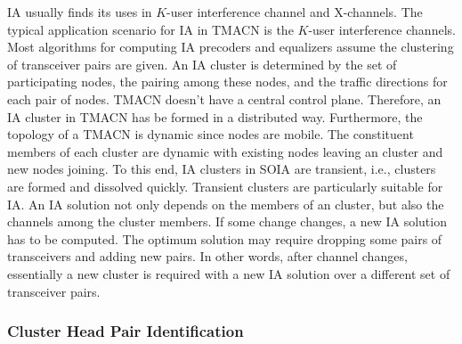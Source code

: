 \documentclass[letterpaper,11pt]{article}
\begin{document}
IA usually finds its uses in $K$-user interference channel and X-channels. The typical application scenario for IA in TMACN is the $K$-user interference channels. Most algorithms for computing IA precoders and equalizers assume the clustering of transceiver pairs are given. An IA cluster is determined by the set of participating nodes,  the pairing among these nodes, and the traffic directions for each pair of nodes. TMACN doesn't have a central control plane. Therefore, an IA cluster in TMACN has be formed in a distributed way. Furthermore, the topology of a TMACN is dynamic since nodes are mobile. The constituent members of each cluster are dynamic with existing nodes leaving an cluster and new nodes joining. To this end, IA clusters in SOIA are transient, i.e., clusters are formed and dissolved quickly. Transient clusters are particularly suitable for IA. An IA solution not only depends on the members of an cluster, but also the channels among the cluster members. If some change changes, a new IA solution has to be computed. The optimum solution may require dropping some pairs of transceivers and adding new pairs. In other words, after channel changes, essentially a new cluster is required with a new IA solution over a different set of transceiver pairs. 

\subsubsection{Cluster Head Pair Identification}
\end{document}
